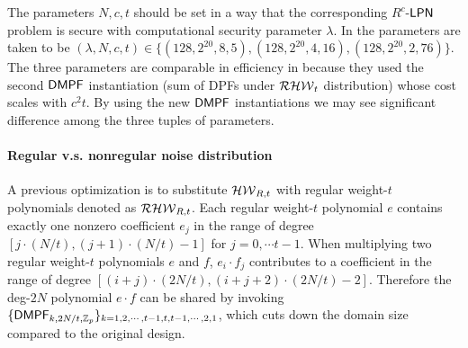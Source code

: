 The parameters $N, c, t$ should be set in a way that the corresponding $R^c$-${\sf LPN}$ problem is secure with computational security parameter $\lambda$. In \cite{cryptoeprint:2022/1035} the parameters are taken to be $(\lambda, N, c, t) \in\{ (128, 2^{20}, 8, 5), (128, 2^{20}, 4, 16), (128, 2^{20}, 2, 76)\}$. The three parameters are comparable in efficiency in \cite{cryptoeprint:2022/1035} because they used the second ${\sf DMPF}$ instantiation (sum of DPFs under $\mathcal{RHW}_t$ distribution) whose cost scales with $c^2t$. By using the new ${\sf DMPF}$ instantiations we may see significant difference among the three tuples of parameters. 

\paragraph{Regular v.s. nonregular noise distribution}

A previous optimization is to substitute $\mathcal{HW}_{R,t}$ with regular weight-$t$ polynomials denoted as $\mathcal{RHW}_{R,t}$. Each regular weight-$t$ polynomial $e$ contains exactly one nonzero coefficient $e_j$ in the range of degree $[j\cdot (N/t), (j+1)\cdot (N/t)-1]$ for $j=0,\cdots t-1$. When multiplying two regular weight-$t$ polynomials $e$ and $f$, $e_i\cdot f_j$ contributes to a coefficient in the range of degree $[(i+j)\cdot (2N/t), (i+j+2)\cdot (2N/t)-2]$. Therefore the deg-$2N$ polynomial $e\cdot f$ can be shared by invoking $\{{\sf DMPF}_{k, 2N/t, \mathbb{Z}_p}\}_{k=1,2,\cdots,t-1,t,t-1,\cdots, 2,1}$, which cuts down the domain size compared to the original design. 

